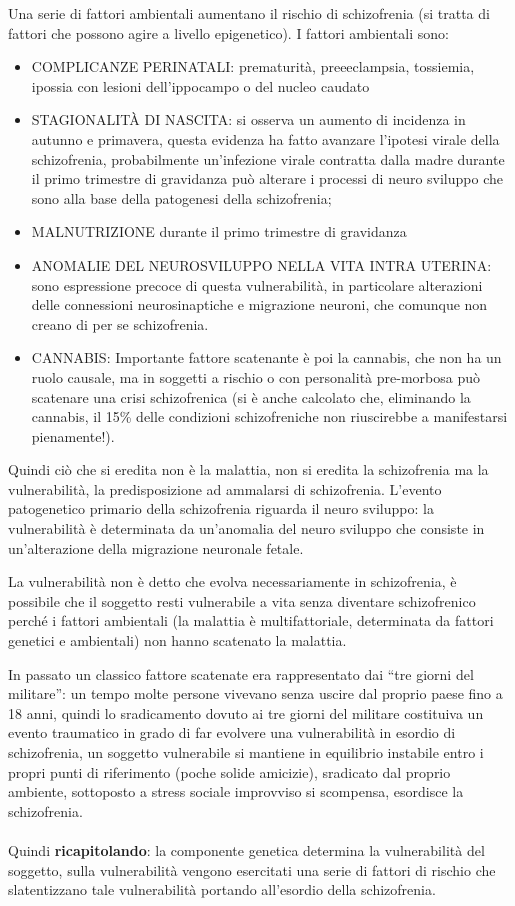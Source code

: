 Una serie di fattori ambientali aumentano il rischio di schizofrenia (si
tratta di fattori che possono agire a livello epigenetico). I fattori
ambientali sono:

\begin{itemize}
\item
  COMPLICANZE PERINATALI: prematurità, preeeclampsia, tossiemia, ipossia
  con lesioni dell'ippocampo o del nucleo caudato
\item
  STAGIONALITÀ DI NASCITA: si osserva un aumento di incidenza in autunno
  e primavera, questa evidenza ha fatto avanzare l'ipotesi virale della
  schizofrenia, probabilmente un'infezione virale contratta dalla madre
  durante il primo trimestre di gravidanza può alterare i processi di
  neuro sviluppo che sono alla base della patogenesi della schizofrenia;
\item
  MALNUTRIZIONE durante il primo trimestre di gravidanza
\item
  ANOMALIE DEL NEUROSVILUPPO NELLA VITA INTRA UTERINA: sono espressione
  precoce di questa vulnerabilità, in particolare alterazioni delle
  connessioni neurosinaptiche e migrazione neuroni, che comunque non
  creano di per se schizofrenia.
\item
  CANNABIS: Importante fattore scatenante è poi la cannabis, che non ha
  un ruolo causale, ma in soggetti a rischio o con personalità
  pre-morbosa può scatenare una crisi schizofrenica (si è anche
  calcolato che, eliminando la cannabis, il 15\% delle condizioni
  schizofreniche non riuscirebbe a manifestarsi pienamente!).
\end{itemize}

Quindi ciò che si eredita non è la malattia, non si eredita la
schizofrenia ma la vulnerabilità, la predisposizione ad ammalarsi di
schizofrenia. L'evento patogenetico primario della schizofrenia riguarda
il neuro sviluppo: la vulnerabilità è determinata da un'anomalia del
neuro sviluppo che consiste in un'alterazione della migrazione neuronale
fetale.

La vulnerabilità non è detto che evolva necessariamente in schizofrenia,
è possibile che il soggetto resti vulnerabile a vita senza diventare
schizofrenico perché i fattori ambientali (la malattia è
multifattoriale, determinata da fattori genetici e ambientali) non hanno
scatenato la malattia.

In passato un classico fattore scatenate era rappresentato dai ``tre
giorni del militare'': un tempo molte persone vivevano senza uscire dal
proprio paese fino a 18 anni, quindi lo sradicamento dovuto ai tre
giorni del militare costituiva un evento traumatico in grado di far
evolvere una vulnerabilità in esordio di schizofrenia, un soggetto
vulnerabile si mantiene in equilibrio instabile entro i propri punti di
riferimento (poche solide amicizie), sradicato dal proprio ambiente,
sottoposto a stress sociale improvviso si scompensa, esordisce la
schizofrenia.
\\\\
Quindi \textbf{ricapitolando}: la componente genetica determina la
vulnerabilità del soggetto, sulla vulnerabilità vengono esercitati una
serie di fattori di rischio che slatentizzano tale vulnerabilità
portando all'esordio della schizofrenia.

